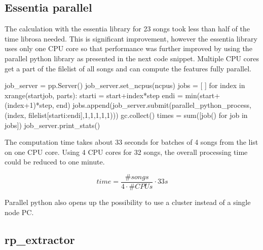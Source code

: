 \subsection{Essentia parallel}

The calculation with the essentia library for 23 songs took less than half of the time librosa needed. This is significant improvement, however the essentia library uses only one CPU core so that performance was further improved by using the parallel python library as presented in the next code snippet. Multiple CPU cores get a part of the filelist of all songs and can compute the features fully parallel. 

\FloatBarrier
\begin{pythonCode}
job_server = pp.Server()
job_server.set_ncpus(ncpus)
jobs = [ ]
for index in xrange(startjob, parts):
	starti = start+index*step
	endi = min(start+(index+1)*step, end)
	jobs.append(job_server.submit(parallel_python_process, (index, filelist[starti:endi],1,1,1,1,1)))
	gc.collect()
times = sum([job() for job in jobs])
job_server.print_stats()
\end{pythonCode}

The computation time takes about 33 seconds for batches of 4 songs from the list on one CPU core. 
Using 4 CPU cores for 32 songs, the overall processing time could be reduced to one minute.

\begin{equation} \label{eq:parallelp}
time = \frac{\#songs}{4 \cdot \#CPUs} \cdot 33s
\end{equation}
 
Parallel python also opens up the possibility to use a cluster instead of a single node PC. 

\subsection{rp\_extractor}

